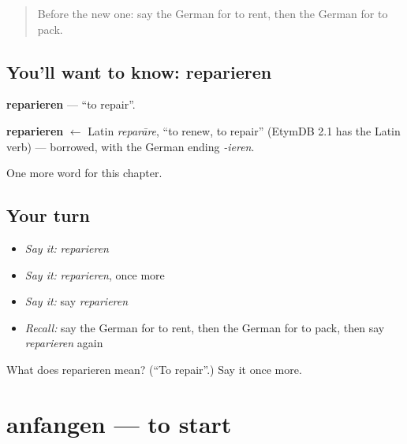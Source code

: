 \label{lesson:GE-C141-reparieren}



\begin{quote}
Before the new one: say the German for to rent, then the German for to pack.
\end{quote}

\subsection*{You'll want to know: reparieren}
\textbf{reparieren} — \textquotedblleft{}to repair\textquotedblright{}.

\begin{cousinweb}
\textbf{reparieren} $\leftarrow$ Latin \emph{reparāre}, \textquotedblleft{}to renew, to repair\textquotedblright{} (EtymDB 2.1 has the Latin verb) — borrowed, with the German ending \emph{-ieren}.
\end{cousinweb}

\begin{grammarlens}[title={What you've built}]
One more word for this chapter.
\end{grammarlens}

\subsection*{Your turn}
\begin{itemize}
\raggedright
  \item \emph{Say it:} \emph{reparieren}
  \item \emph{Say it:} \emph{reparieren}, once more
  \item \emph{Say it:} say \emph{reparieren}
  \item \emph{Recall:} say the German for to rent, then the German for to pack, then say \emph{reparieren} again
\end{itemize}

\begin{tcolorbox}[breakable,colback=teal!4,colframe=teal!35!black,title={Before you move on}]
What does reparieren mean? (\textquotedblleft{}To repair\textquotedblright{}.) Say it once more.
\end{tcolorbox}
\section[anfangen]{anfangen — to start}

\label{lesson:GE-C141-anfangen}



